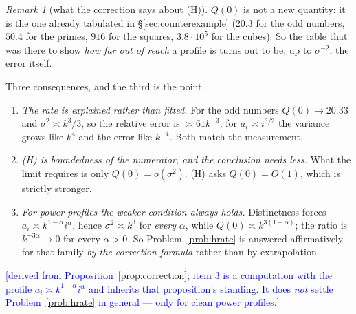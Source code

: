 \documentclass[11pt,a4paper]{article}
\theoremstyle{plain}
\theoremstyle{definition}
\theoremstyle{remark}
\newtheorem{remark}[theorem]{Remark}
\newcommand{\STATUS}[1]{\textcolor{blue}{\textsf{[#1]}}}
\begin{document}
\begin{remark}[what the correction says about \textup{(H)}]\label{rem:correctionH}
$Q(0)$ is not a new quantity: it is the one already tabulated in \S\ref{sec:counterexample}
($20.3$ for the odd numbers, $50.4$ for the primes, $916$ for the squares, $3.8\cdot10^{5}$ for
the cubes). So the table that was there to show \emph{how far out of reach} a profile is turns
out to be, up to $\sigma^{-2}$, the error itself.

Three consequences, and the third is the point.
\begin{enumerate}
\item \emph{The rate is explained rather than fitted.} For the odd numbers $Q(0)\to20.33$ and
      $\sigma^{2}\asymp k^{3}/3$, so the relative error is $\asymp61k^{-3}$; for
      $a_i\asymp i^{3/2}$ the variance grows like $k^{4}$ and the error like $k^{-4}$. Both match
      the measurement.
\item \emph{\textup{(H)} is boundedness of the numerator, and the conclusion needs less.} What the
      limit requires is only $Q(0)=o(\sigma^{2})$. \textup{(H)} asks $Q(0)=O(1)$, which is
      strictly stronger.
\item \emph{For power profiles the weaker condition always holds.} Distinctness forces
      $a_i\asymp k^{1-\alpha}i^{\alpha}$, hence $\sigma^{2}\asymp k^{3}$ for \emph{every}
      $\alpha$, while $Q(0)\asymp k^{3(1-\alpha)}$; the ratio is $k^{-3\alpha}\to0$ for every
      $\alpha>0$. So Problem~\ref{prob:hrate} is answered affirmatively for that family \emph{by
      the correction formula} rather than by extrapolation.
\end{enumerate}
\STATUS{derived from Proposition~\ref{prop:correction}; item 3 is a computation with the profile
$a_i\asymp k^{1-\alpha}i^{\alpha}$ and inherits that proposition's standing. It does \emph{not}
settle Problem~\ref{prob:hrate} in general --- only for clean power profiles.}
\end{remark}
\end{document}
